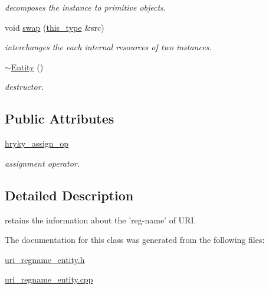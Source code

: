 \begin{DoxyCompactItemize}
\begin{DoxyCompactList}\small\item\em decomposes the instance to primitive objects. \end{DoxyCompactList}\item 
\hypertarget{classhryky_1_1uri_1_1regname_1_1_entity_a2fb8b135d5dc40b2daa2520c952b2e64}{void \hyperlink{classhryky_1_1uri_1_1regname_1_1_entity_a2fb8b135d5dc40b2daa2520c952b2e64}{swap} (\hyperlink{classhryky_1_1uri_1_1regname_1_1_entity_ab3e7322abf5cdcaca367ea56179c1862}{this\-\_\-type} \&src)}\label{classhryky_1_1uri_1_1regname_1_1_entity_a2fb8b135d5dc40b2daa2520c952b2e64}

\begin{DoxyCompactList}\small\item\em interchanges the each internal resources of two instances. \end{DoxyCompactList}\item 
\hypertarget{classhryky_1_1uri_1_1regname_1_1_entity_a012ba15450f020918b1d4a1b098c240f}{\hyperlink{classhryky_1_1uri_1_1regname_1_1_entity_a012ba15450f020918b1d4a1b098c240f}{$\sim$\-Entity} ()}\label{classhryky_1_1uri_1_1regname_1_1_entity_a012ba15450f020918b1d4a1b098c240f}

\begin{DoxyCompactList}\small\item\em destructor. \end{DoxyCompactList}\end{DoxyCompactItemize}
\subsection*{Public Attributes}
\begin{DoxyCompactItemize}
\item 
\hypertarget{classhryky_1_1uri_1_1regname_1_1_entity_a7f1c4983f7632aaa8354d0c22dc11a8a}{\hyperlink{classhryky_1_1uri_1_1regname_1_1_entity_a7f1c4983f7632aaa8354d0c22dc11a8a}{hryky\-\_\-assign\-\_\-op}}\label{classhryky_1_1uri_1_1regname_1_1_entity_a7f1c4983f7632aaa8354d0c22dc11a8a}

\begin{DoxyCompactList}\small\item\em assignment operator. \end{DoxyCompactList}\end{DoxyCompactItemize}


\subsection{Detailed Description}
retains the information about the 'reg-\/name' of U\-R\-I. 

The documentation for this class was generated from the following files\-:\begin{DoxyCompactItemize}
\item 
\hyperlink{uri__regname__entity_8h}{uri\-\_\-regname\-\_\-entity.\-h}\item 
\hyperlink{uri__regname__entity_8cpp}{uri\-\_\-regname\-\_\-entity.\-cpp}\end{DoxyCompactItemize}
